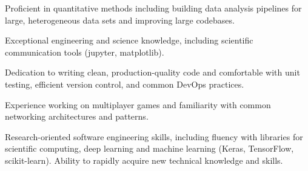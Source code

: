 

\begin{cventries}
    \vspace{2mm}
    \begin{cvparagraph}
        \begin{cvitems}
            \item{Proficient in quantitative methods including building data analysis pipelines for large, heterogeneous data sets and
            improving large codebases.}
            \vspace{1mm}
            \item{Exceptional engineering and science knowledge, including scientific communication tools (jupyter, matplotlib).}
            \vspace{1mm}
            \item{Dedication to writing clean, production-quality code and comfortable with unit testing, efficient version control, and common DevOps practices.}
            \vspace{1mm}
            \item{Experience working on multiplayer games and familiarity with common networking architectures and patterns.}
            \vspace{1mm}
            \item{Research-oriented software engineering skills, including fluency with libraries for scientific computing, deep learning
            and machine learning (Keras, TensorFlow, scikit-learn). Ability to rapidly acquire new technical knowledge and skills.}
            \vspace{1mm}
        \end{cvitems}
    \end{cvparagraph}

\end{cventries}
